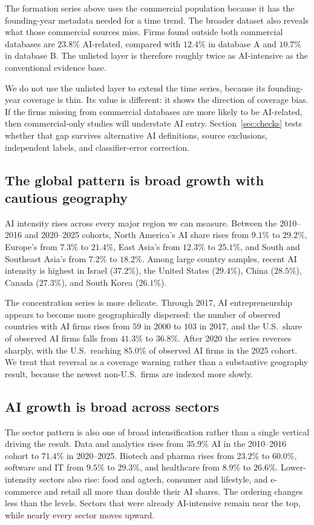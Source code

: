 The formation series above uses the commercial population because it has the
founding-year metadata needed for a time trend. The broader dataset also
reveals what those commercial sources miss. Firms found outside both
commercial databases are $23.8\%$ AI-related, compared with $12.4\%$ in
database A and $10.7\%$ in database B. The unlisted layer is therefore roughly
twice as AI-intensive as the conventional evidence base.

We do not use the unlisted layer to extend the time series, because its
founding-year coverage is thin. Its value is different: it shows the direction
of coverage bias. If the firms missing from commercial databases are more
likely to be AI-related, then commercial-only studies will understate AI entry.
Section~\ref{sec:checks} tests whether that gap survives alternative AI
definitions, source exclusions, independent labels, and classifier-error
correction.

\subsection{The global pattern is broad growth with cautious geography}

AI intensity rises across every major region we can measure. Between the
2010--2016 and 2020--2025 cohorts, North America's AI share rises from $9.1\%$
to $29.2\%$, Europe's from $7.3\%$ to $21.4\%$, East Asia's from $12.3\%$ to
$25.1\%$, and South and Southeast Asia's from $7.2\%$ to $18.2\%$. Among large
country samples, recent AI intensity is highest in Israel ($37.2\%$), the
United States ($29.4\%$), China ($28.5\%$), Canada ($27.3\%$), and South Korea
($26.1\%$).

The concentration series is more delicate. Through 2017, AI entrepreneurship
appears to become more geographically dispersed: the number of observed
countries with AI firms rises from $59$ in 2000 to $103$ in 2017, and the U.S.\
share of observed AI firms falls from $41.3\%$ to $36.8\%$. After 2020 the
series reverses sharply, with the U.S.\ reaching $85.0\%$ of observed AI firms
in the 2025 cohort. We treat that reversal as a coverage warning rather than a
substantive geography result, because the newest non-U.S.\ firms are indexed
more slowly.

\subsection{AI growth is broad across sectors}

The sector pattern is also one of broad intensification rather than a single
vertical driving the result. Data and analytics rises from $35.9\%$ AI in the
2010--2016 cohort to $71.4\%$ in 2020--2025. Biotech and pharma rises from
$23.2\%$ to $60.0\%$, software and IT from $9.5\%$ to $29.3\%$, and healthcare
from $8.9\%$ to $26.6\%$. Lower-intensity sectors also rise: food and agtech,
consumer and lifestyle, and e-commerce and retail all more than double their
AI shares. The ordering changes less than the levels. Sectors that were already
AI-intensive remain near the top, while nearly every sector moves upward.
